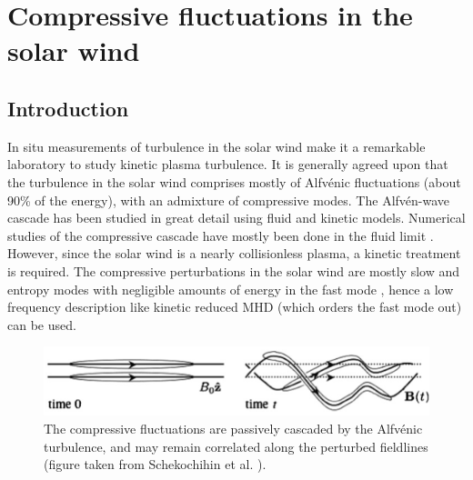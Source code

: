 \chapter{Compressive fluctuations in the solar wind}
\label{chap:slowmodes}
\section{Introduction}
\label{slowmodes:sec:intro}

    In situ measurements of turbulence in the solar wind \cite{coleman68,
    matthaeus82,bale05, podesta07,tessein09,podesta10}  make it a remarkable laboratory
    to study kinetic plasma turbulence. It is generally agreed upon
    that the turbulence in the solar wind comprises mostly of Alfv\'{e}nic fluctuations
    \cite{belcher71} (about
    90\% of the energy), with an admixture of compressive modes. The Alfv\'{e}n-wave cascade has been studied in
    great detail using fluid \cite{kinney98, cho00, maron01, cho02, dmitruk03, muller03,
    haugen04, oughton04, muller05, mason08, perez08, beresnyak11, beresnyak11prl, mason11,
    mason12, perez12} and kinetic \cite{howes08pop, howes08prl, nielson13} models.
    Numerical studies of the compressive cascade have mostly been done in the
    fluid limit \cite{lithwick01, cho02prl, cho03, beresnyak05, cho05, kowal07}. However,
    since the solar wind is a nearly collisionless plasma, a kinetic treatment is
    required. The compressive perturbations in the solar wind are mostly slow and entropy
    modes with negligible amounts of energy in the fast mode \cite{klein12}, hence a low
    frequency description like kinetic reduced MHD (which orders the fast mode out) can be used.

    \begin{figure}
    \begin{center}
        \includegraphics[width=12cm]{figs/slowmodes/slow_parallel_cascade.png}
        \caption{The compressive fluctuations are passively cascaded by the Alfv\'{e}nic
        turbulence, and may remain correlated along the perturbed fieldlines (figure taken
        from Schekochihin et al. \cite{tome}).}
        \label{slowmodes:fig:slow_par}
    \end{center}
    \end{figure}

